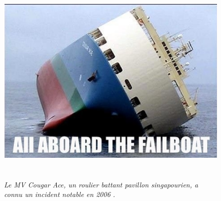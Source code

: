 \documentclass[a4paper,12pt,openany]{report}
\begin{document}
\begin{figure}[H]
	\begin{center}
	                  \begin{minipage}{\textwidth}
	     			  \begin{center}
	     			  \includegraphics[width=1\textwidth,height=4in]{images/MC_cougar_ace.png}
	     			    \end{center}
	     			    \end{minipage}
		\caption{\emph{Le MV Cougar Ace, un roulier battant pavillon singapourien, a connu un incident notable en 2006 \cite{USCG2006}.\label{fig1.3} }} 
	\end{center}
\end{figure}
\end{document}
